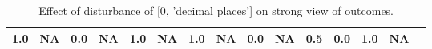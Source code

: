\begin{table}
\begin{tabular}{l|cc|cc|cc|cc|cc|cc|cc}
\cellcolor{Bittersweet}1.0&\cellcolor{Bittersweet}NA&\cellcolor{Bittersweet}0.0&\cellcolor{Bittersweet}NA&\cellcolor{Bittersweet}1.0&\cellcolor{Bittersweet}NA&\cellcolor{Bittersweet}1.0&\cellcolor{Bittersweet}NA&\cellcolor{Bittersweet}0.0&\cellcolor{Bittersweet}NA&\cellcolor{Bittersweet}0.5&\cellcolor{Bittersweet}0.0&\cellcolor{Bittersweet}1.0&\cellcolor{Bittersweet}NA\\\bottomrule\end{tabular}\caption{Effect of disturbance of [0, 'decimal places'] on strong view of outcomes.}\end{table}
